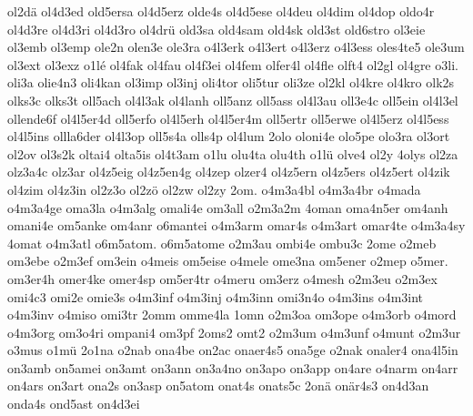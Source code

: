 {    ol2dä
    ol4d3ed
    old5ersa
    ol4d5erz
    olde4s
    ol4d5ese
    ol4deu
    ol4dim
    ol4dop
    oldo4r
    ol4d3re
    ol4d3ri
    ol4d3ro
    ol4drü
    old3sa
    old4sam
    old4sk
    old3st
    old6stro
    ol3eie
    ol3emb
    ol3emp
    ole2n
    olen3e
    ole3ra
    o4l3erk
    o4l3ert
    o4l3erz
    o4l3ess
    oles4te5
    ole3um
    ol3ext
    ol3exz
    o1lé
    ol4fak
    ol4fau
    ol4f3ei
    ol4fem
    olfer4l
    ol4fle
    olft4
    ol2gl
    ol4gre
    o3li.
    oli3a
    olie4n3
    oli4kan
    ol3imp
    ol3inj
    oli4tor
    oli5tur
    oli3ze
    ol2kl
    ol4kre
    ol4kro
    olk2s
    olks3c
    olks3t
    oll5ach
    ol4l3ak
    ol4lanh
    oll5anz
    oll5ass
    ol4l3au
    oll3e4c
    oll5ein
    ol4l3el
    ollende6f
    ol4l5er4d
    oll5erfo
    ol4l5erh
    ol4l5er4m
    oll5ertr
    oll5erwe
    ol4l5erz
    ol4l5ess
    ol4l5ins
    ollla6der
    ol4l3op
    oll5s4a
    olls4p
    ol4lum
    2olo
    oloni4e
    olo5pe
    olo3ra
    ol3ort
    ol2ov
    ol3s2k
    oltai4
    olta5is
    ol4t3am
    o1lu
    olu4ta
    olu4th
    o1lü
    olve4
    ol2y
    4olys
    ol2za
    olz3a4c
    olz3ar
    ol4z5eig
    ol4z5en4g
    ol4zep
    olzer4
    ol4z5ern
    ol4z5ers
    ol4z5ert
    ol4zik
    ol4zim
    ol4z3in
    ol2z3o
    ol2zö
    ol2zw
    ol2zy
    2om.
    o4m3a4bl
    o4m3a4br
    o4mada
    o4m3a4ge
    oma3la
    o4m3alg
    omali4e
    om3all
    o2m3a2m
    4oman
    oma4n5er
    om4anh
    omani4e
    om5anke
    om4anr
    o6mantei
    o4m3arm
    omar4s
    o4m3art
    omar4te
    o4m3a4sy
    4omat
    o4m3atl
    o6m5atom.
    o6m5atome
    o2m3au
    ombi4e
    ombu3c
    2ome
    o2meb
    om3ebe
    o2m3ef
    om3ein
    o4meis
    om5eise
    o4mele
    ome3na
    om5ener
    o2mep
    o5mer.
    om3er4h
    omer4ke
    omer4sp
    om5er4tr
    o4meru
    om3erz
    o4mesh
    o2m3eu
    o2m3ex
    omi4c3
    omi2e
    omie3s
    o4m3inf
    o4m3inj
    o4m3inn
    omi3n4o
    o4m3ins
    o4m3int
    o4m3inv
    o4miso
    omi3tr
    2omm
    omme4la
    1omn
    o2m3oa
    om3ope
    o4m3orb
    o4mord
    o4m3org
    om3o4ri
    ompani4
    om3pf
    2oms2
    omt2
    o2m3um
    o4m3unf
    o4munt
    o2m3ur
    o3mus
    o1mü
    2o1na
    o2nab
    ona4be
    on2ac
    onaer4s5
    ona5ge
    o2nak
    onaler4
    ona4l5in
    on3amb
    on5amei
    on3amt
    on3ann
    on3a4no
    on3apo
    on3app
    on4are
    o4narm
    on4arr
    on4ars
    on3art
    ona2s
    on3asp
    on5atom
    onat4s
    onats5c
    2onä
    onär4s3
    on4d3an
    onda4s
    ond5ast
    on4d3ei
}
